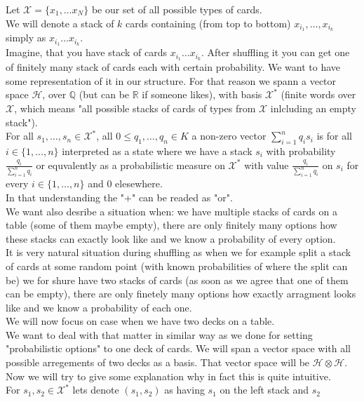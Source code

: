 \documentclass[a4paper, 12pt]{report}
\begin{document}
Let $\mathcal{X} = \{x_1, \dots x_N\}$ be our set of all possible types of cards. \\
We will denote a stack of $k$ cards containing (from top to bottom) $x_{i_1}, \dots, x_{i_k}$ simply as 
$x_{i_1}\dots x_{i_k}$. \\
Imagine, that you have stack of cards $x_{i_1}\dots x_{i_k}$. After shuffling it
you can get one of finitely many stack of cards each with certain probability. We want to have some
representation of it in our structure. 
For that reason we spann a vector space $\mathcal{H}$, over $\mathbb{Q}$ (but can be $\mathbb{R}$ if someone 
likes), 
with basis $\mathcal{X}^*$ (finite words over $\mathcal{X}$, which means "all possible stacks 
of cards of types from $\mathcal{X}$ inlcluding an empty stack"). \\
For all $s_1, \dots, s_n \in \mathcal{X}^*$, all $0 \leq q_1, \dots, q_n \in K$ a non-zero vector 
$\displaystyle\sum^{n}_{i = 1} q_is_i$ is for all $i \in \{1, \dots, n\}$ 
interpreted as a state where we have a stack $s_i$ with probability $\frac{q_i}{\sum^n_{i=1} q_i}$ or 
equvalently as a probabilistic measure on $\mathcal{X}^*$ with value $\frac{q_i}{\sum^n_{i=1} q_i}$ on $s_i$ 
for every $i \in \{1, \dots, n\}$ and $0$ elesewhere. \\
In that understanding the "+" can be readed as "or". \\
We want also desribe a situation when: we have multiple stacks of cards on a table (some of them maybe 
empty), there are only finitely many options how 
these stacks can exactly look like and we know a probability of every option.\\ 
It is very natural situation during shuffling as when we for example split a stack of cards at some 
random point (with known probabilities of where the split can be) 
we for shure have two stacks of cards (as soon as we agree that one of them can be empty), 
there are only finetely many options how exactly arragment looks like and we know a probability of each one. 
\\ We will now focus on case when we have two decks on a table. \\
We want to deal with that matter in similar way as we done for setting "probabilistic options" to one deck 
of cards. We will span a vector space with all possible arregements of two decks as a basis. 
That vector space will be $\mathcal{H} \otimes \mathcal{H}$. Now we will try to give some explanation why in 
fact this is quite intuitive.  \\
For $s_1, s_2 \in \mathcal{X}^*$ lets denote $(s_1, s_2)$ as having $s_1$ on the left stack and $s_2$ 
\end{document}
